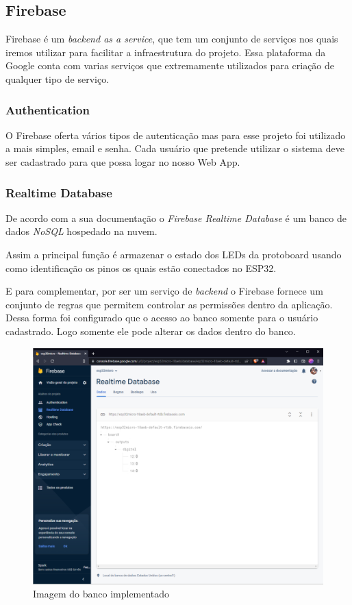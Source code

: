 \documentclass[12pt]{article}
\begin{document}
\subsection{Firebase}
Firebase é um \emph{backend as a service}, que tem um conjunto de serviços nos quais iremos utilizar para
facilitar a infraestrutura do projeto. Essa plataforma da Google conta com varias serviços que extremamente
utilizados para criação de qualquer tipo de serviço.

\subsubsection{Authentication}
O Firebase oferta vários tipos de autenticação mas para esse projeto foi utilizado a mais simples, email e senha. Cada usuário que pretende utilizar o sistema deve ser cadastrado para que possa logar no nosso Web App.
\subsubsection{Realtime Database}
De acordo com a sua documentação o \emph{Firebase Realtime Database} é um banco de dados \emph{NoSQL} hospedado na nuvem.\nocite{FIREBASERD}

Assim a principal função é armazenar o estado dos LEDs da protoboard usando como identificação os pinos os quais estão conectados no ESP32.

E para complementar, por ser um serviço de \emph{backend} o Firebase fornece um conjunto de regras que permitem controlar as permissões dentro da aplicação.
Dessa forma foi configurado que o acesso ao banco somente para o usuário cadastrado.
Logo somente ele pode alterar os dados dentro do banco.

\begin{figure}[ht]
  \centering
  \includegraphics[width=.5\textwidth]{Images/frd3.png}
  \caption{Imagem do banco implementado}
  \label{fig:FirebaseRealtimeDatabase}
\end{figure}
\end{document}
